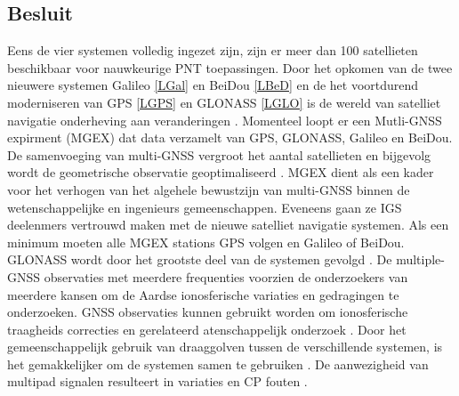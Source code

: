 \subsection{Besluit}
Eens de vier systemen volledig ingezet zijn, zijn er meer dan 100 satellieten beschikbaar voor nauwkeurige PNT toepassingen. Door het opkomen van de twee nieuwere systemen Galileo \ref{LGal} en BeiDou \ref{LBeD} en de het voortdurend moderniseren van GPS \ref{LGPS} en GLONASS \ref{LGLO} is de wereld van satelliet navigatie onderheving aan veranderingen \cite{LBibGNSS4}. Momenteel loopt er een Mutli-GNSS expirment (MGEX) dat data verzamelt van GPS, GLONASS, Galileo en BeiDou. De samenvoeging van multi-GNSS vergroot het aantal satellieten en bijgevolg wordt de geometrische observatie geoptimaliseerd \cite{LBibGNSS5}. 
MGEX dient als een kader voor het verhogen van het algehele bewustzijn van multi-GNSS binnen de wetenschappelijke en ingenieurs gemeenschappen. Eveneens gaan ze IGS deelenmers vertrouwd maken met de nieuwe satelliet navigatie systemen. Als een minimum moeten alle MGEX stations GPS volgen en Galileo of BeiDou. GLONASS wordt door het grootste deel van de systemen gevolgd \cite{LBibGNSS9}.  De multiple-GNSS observaties met meerdere frequenties voorzien de onderzoekers van meerdere kansen om de Aardse ionosferische variaties en gedragingen te onderzoeken. GNSS observaties kunnen gebruikt worden om ionosferische traagheids correcties en gerelateerd atenschappelijk onderzoek \cite{LBibBeiDou}. Door het gemeenschappelijk gebruik van draaggolven tussen de verschillende systemen, is het gemakkelijker om de systemen samen te gebruiken \cite{LBibPPP2}. De aanwezigheid van multipad signalen resulteert in variaties en CP fouten \cite{LBibGalileo3}. 


